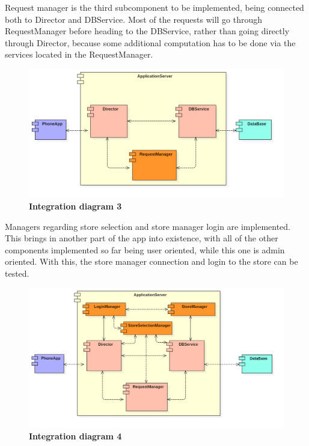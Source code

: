  

Request manager is the third subcomponent to be implemented, being connected both to Director and DBService. Most of the requests will go through RequestManager before heading to the DBService, rather than going directly through Director, because some additional computation has to be done via the services located in the RequestManager. 

 
\begin{figure}[!h]
\centering
\includegraphics[width=\textwidth]{Images/IntegrationDiagram3}
\caption{\label{fig:imp3}\textbf{Integration diagram 3}}
\end{figure}

 

Managers regarding store selection and store manager login are implemented. This brings in another part of the app into existence, with all of the other components implemented so far being user oriented, while this one is admin oriented. With this, the store manager connection and login to the store can be tested. 

 
\begin{figure}[!h]
\centering
\includegraphics[width=\textwidth]{Images/IntegrationDiagram4}
\caption{\label{fig:imp4}\textbf{Integration diagram 4}}
\end{figure}
 

